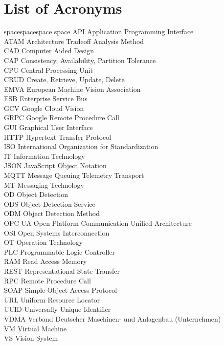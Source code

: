 \chapter*{List of Acronyms}
\thispagestyle{empty}
\begin{tabbing}
spacespacespace \= space \kill
API	 \> 	Application Programming Interface	 \\
ATAM	 \> 	Architecture Tradeoff Analysis Method	 \\
CAD	 \> 	Computer Aided Design	 \\
CAP	 \> 	Consistency, Availability, Partition Tolerance	 \\
CPU	 \> 	Central Processing Unit	 \\
CRUD	 \> 	Create, Retrieve, Update, Delete	 \\
EMVA \> European Machine Vision Association\\
ESB	\>	Enterprise Service Bus \\
GCV	\>	Google Cloud Vision \\
GRPC     \>  Google Remote Procedure Call\\
GUI	\>	Graphical User Interface \\
HTTP	 \> 	Hypertext Transfer Protocol	 \\
ISO    \>  International Organization for Standardization\\
IT  \>  Information Technology\\
JSON	\>	JavaScript Object Notation \\
MQTT     \>  Message Queuing Telemetry Transport\\
MT      \> Messaging Technology\\
OD     \>  Object Detection\\
ODS     \>  Object Detection Service\\
ODM     \>  Object Detection Method\\
OPC UA     \>  Open Platform Communication Unified Architecture\\
OSI     \>  Open Systems Interconnection\\
OT  \> Operation Technology\\
PLC  \> Programmable Logic Controller\\
RAM    \> Read Access Memory \\
REST    \> Representational State Transfer \\
RPC    \> Remote Procedure Call \\
SOAP	 \> 	Simple Object Access Protocol	 \\
URL	 \> 	Uniform Resource Locator	 \\
UUID	 \> 	Universally Unique Identifier	 \\
VDMA \>     Verband Deutscher Maschinen- und Anlagenbau (Unternehmen) \\
VM	 \> 	Virtual Machine	 \\
VS  \>  Vision System\\
\end{tabbing}
\endinput
